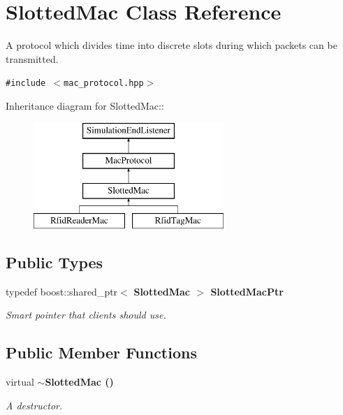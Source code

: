 \section{Slotted\-Mac Class Reference}
\label{classSlottedMac}
A protocol which divides time into discrete slots during which packets can be transmitted.  


{\tt \#include $<$mac\_\-protocol.hpp$>$}

Inheritance diagram for Slotted\-Mac::\begin{figure}[H]
\begin{center}
\leavevmode
\includegraphics[height=4cm]{classSlottedMac}
\end{center}
\end{figure}
\subsection*{Public Types}
\begin{CompactItemize}
\item 
typedef boost::shared\_\-ptr$<$ \bf{Slotted\-Mac} $>$ \bf{Slotted\-Mac\-Ptr}\label{classSlottedMac_2017056aae90ca668491d299866cb0e9}

\begin{CompactList}\small\item\em Smart pointer that clients should use. \item\end{CompactList}\end{CompactItemize}
\subsection*{Public Member Functions}
\begin{CompactItemize}
\item 
virtual \bf{$\sim$Slotted\-Mac} ()\label{classSlottedMac_e86bc778598e00329b21f8e5f4ee8b72}

\begin{CompactList}\small\item\em A destructor. \item\end{CompactList}\end{CompactItemize}
